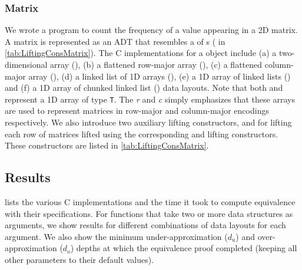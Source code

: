 

\subsubsection{Matrix}
We wrote a
\SpecL{} program to count the frequency of a value appearing in a 2D matrix.
A matrix is represented as an ADT that resembles a  of s ( in \cref{tab:LiftingConsMatrix}).
The C implementations for a  object include
(a) a two-dimensional array (), (b) a flattened row-major array (),
(c) a flattened column-major array (), (d) a linked list of 1D arrays (),
(e) a 1D array of linked lists () and (f) a 1D array of chunked linked list ()
data layouts. Note that both  and  represent a 1D array of type {\tt T}. The {\em r} and {\em c} simply
emphasizes that these arrays are used to represent matrices in row-major and column-major encodings respectively.
We also introduce two auxiliary lifting constructors,  and 
for lifting each row of matrices lifted using the corresponding  and   lifting
constructors. These constructors are listed in \cref{tab:LiftingConsMatrix}.



\subsection{Results}
\label{sec:results}
 lists the various C implementations and the time it took
to compute equivalence with their specifications. For functions that
take two or more data structures as arguments, we show
results for different combinations of data layouts for each argument.
We also show the minimum under-approximation ($d_u$) and over-approximation ($d_o$) depths
at which the equivalence proof completed (keeping all other parameters to their
default values).

